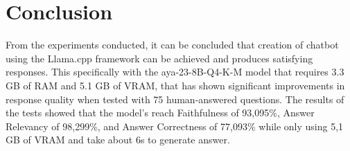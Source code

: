 \section{Conclusion}
\label{sec:kesimpulan}


From the experiments conducted, it can be concluded that creation of chatbot using the Llama.cpp framework can be achieved and produces satisfying responses. This specifically with the aya-23-8B-Q4-K-M model that requires 3.3 GB of RAM and 5.1 GB of VRAM, that has shown significant improvements in response quality when tested with 75 human-answered questions. The results of the tests showed that the model's reach Faithfulness of 93,095\%, Answer Relevancy of 98,299\%, and Answer Correctness of 77,093\% while only using 5,1 GB of VRAM and take about 6s to generate answer.
